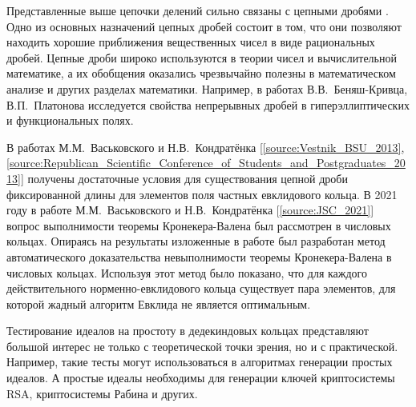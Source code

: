 \documentclass[_00_dissertation.tex]{subfiles}
\begin{document}
Представленные выше цепочки делений сильно связаны с цепными дробями \cite{source:Vinogradov}.
Одно из основных назначений цепных дробей состоит в том, что они позволяют находить хорошие приближения вещественных чисел в виде рациональных дробей.
Цепные дроби широко используются в теории чисел и вычислительной математике, а их обобщения оказались чрезвычайно полезны в математическом анализе и других разделах математики.
Например, в работах В.В.~Беняш-Кривца, В.П.~Платонова \cite{source:Benyash-Krivets_1, source:Benyash-Krivets_2} исследуется свойства непрерывных дробей в гиперэллиптических и функциональных полях.

В работах М.М.~Васьковского и Н.В.~Кондратёнка [\ref{source:Vestnik_BSU_2013}, \ref{source:Republican_Scientific_Conference_of_Students_and_Postgraduates_2013}] получены достаточные условия для существования цепной дроби фиксированной длины для элементов поля частных евклидового кольца.
В 2021 году в работе М.М.~Васьковского и Н.В.~Кондратёнка [\ref{source:JSC_2021}] вопрос выполнимости теоремы Кронекера-Валена был рассмотрен в числовых кольцах.
Опираясь на результаты изложенные в работе \cite{source:Cerri, source:Lezowski} был разработан метод автоматического доказательства невыполнимости теоремы Кронекера-Валена в числовых кольцах.
Используя этот метод было показано, что для каждого действительного норменно-евклидового кольца существует пара элементов, для которой жадный алгоритм Евклида не является оптимальным.


Тестирование идеалов на простоту в дедекиндовых кольцах представляют большой интерес не только с теоретической точки зрения, но и с практической.
Например, такие тесты могут использоваться в алгоритмах генерации простых идеалов.
А простые идеалы необходимы для генерации ключей криптосистемы RSA, криптосистемы Рабина и других.
\end{document}

